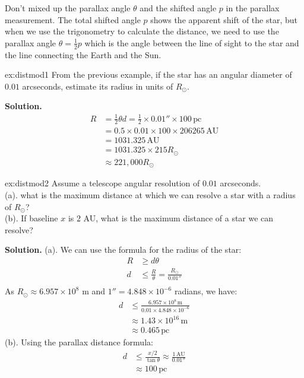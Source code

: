 \clearpage
\begin{importantnote}
    Don't mixed up the parallax angle $\theta$ and the shifted angle $p$ in the parallax measurement. The total shifted angle $p$ shows the apparent shift of the star, but when we use the trigonometry to calculate the distance, we need to use the parallax angle $\theta = \frac{1}{2}p$ which is the angle between the line of sight to the star and the line connecting the Earth and the Sun. 
\end{importantnote}

\bigskip\noindent
\begin{example}{}{ex:distmod1}
    From the previous example, if the star has an angular diameter of $0.01$ arcseconds, estimate its radius in units of $R_\odot$.

    \smallskip\textbf{Solution.}
    \begin{align*}
    R &= \frac{1}{2}\theta d = \frac{1}{2} \times 0.01'' \times 100\,\text{pc} \\
    &= 0.5 \times 0.01 \times 100 \times 206265\,\text{AU} \\
    &= 1031.325\,\text{AU} \\   
    &= 1031.325 \times 215 R_\odot \\
    &\approx 221,000 R_\odot
    \end{align*}
\end{example}
\bigskip\noindent
\begin{example}{}{ex:distmod2}
    Assume a telescope angular resolution of $0.01$ arcseconds. \\
    (a). what is the maximum distance at which we can resolve a star with a radius of $R_\odot$? \\
    (b). If baseline $x$ is $2$ AU, what is the maximum distance of a star we can resolve?

    \smallskip\textbf{Solution.}
    (a). We can use the formula for the radius of the star:
        \begin{align*}
            R &\geq d \theta \\
            d &\leq \frac{R}{\theta} = \frac{R_\odot}{0.01''} \\
        \end{align*}
        As $R_\odot \approx 6.957 \times 10^8$ m and $1'' = 4.848 \times 10^{-6}$ radians, we have:
        \begin{align*}
            d &\leq \frac{6.957 \times 10^8\,\text{m}}{0.01 \times 4.848 \times 10^{-6}} \\
            &\approx 1.43 \times 10^{16}\,\text{m} \\
            &\approx 0.465\,\text{pc}
        \end{align*}
    (b). Using the parallax distance formula:
        \begin{align*}
            d &\leq \frac{x/2}{\tan\theta} \approx \frac{1\,\text{AU}}{0.01''} \\
            &\approx 100\,\text{pc}
        \end{align*}
\end{example}

